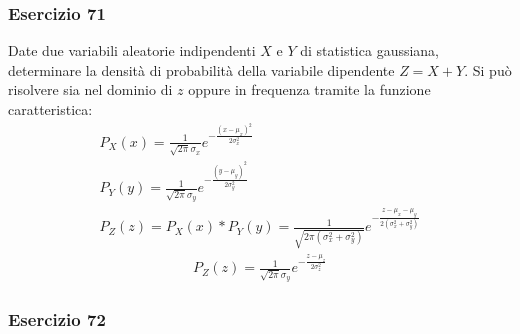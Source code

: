 \documentclass{article}
\begin{document}
\subsubsection*{Esercizio 71}

Date due variabili aleatorie indipendenti $X$ e $Y$ di statistica gaussiana, determinare la densità di probabilità della variabile dipendente $Z=X+Y$. 
Si può risolvere sia nel dominio di $z$ oppure in frequenza tramite la funzione caratteristica:
\begin{gather*}
    P_X(x)=\displaystyle\frac{1}{\sqrt{2\pi}\sigma_x}e^{-\frac{(x-\mu_x)^2}{2\sigma_x^2}}\\
    P_Y(y)=\displaystyle\frac{1}{\sqrt{2\pi}\sigma_y}e^{-\frac{(y-\mu_y)^2}{2\sigma_y^2}}\\
    P_Z(z)=P_X(x)*P_Y(y)=\displaystyle\frac{1}{\sqrt{2\pi(\sigma_x^2+\sigma_y^2)}}e^{-\frac{z-\mu_x-\mu_y}{2(\sigma_x^2+\sigma_y^2)}}
\end{gather*}
\begin{gather}
    P_Z(z)=\displaystyle\frac{1}{\sqrt{2\pi}\sigma_y}e^{-\frac{z-\mu_z}{2\sigma_z^2}}
\end{gather} 

\subsubsection*{Esercizio 72}
\end{document}
